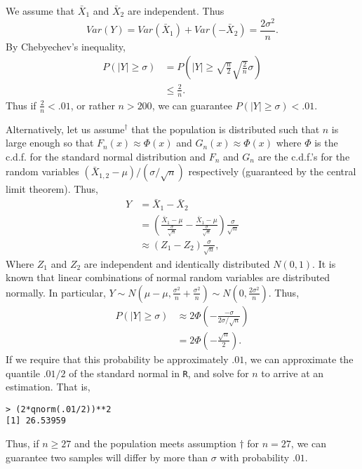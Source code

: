 \documentclass{stat_homework}
\begin{document}
\begin{solution}
  We assume that $\bar X_1$ and $\bar X_2$ are independent.  Thus 
  $$Var(Y) = Var(\bar X_1) + Var(-\bar X_2) = \frac{2\sigma^2}{n}.$$
  By Chebyechev's inequality,
  \begin{align*}
  P(|Y| \ge \sigma ) 
  &= P\left( |Y| \ge \sqrt{\frac n2} \sqrt{\frac 2n}\sigma\right) \\
  &\le \frac 2n. 
  \end{align*}
  Thus if $\frac 2n < .01 $, or rather $n > 200$, we can guarantee $P(|Y| \ge \sigma) < .01$.

  Alternatively, let us assume$^\dagger$ that the population is distributed such that $n$ is large enough so that $F_{n}(x) \approx \Phi(x)$ and $G_n(x) \approx \Phi(x)$ where $\Phi$ is the c.d.f. for the standard normal distribution and $F_{n}$ and $G_{n}$ are the c.d.f.'s for the random variables $(\bar X_{1,2} -\mu)/(\sigma/\sqrt {n})$ respectively (guaranteed by the central limit theorem). Thus,
  \begin{align*}
    Y &= \bar X_1 - \bar X_2 \\
      &= \left( \frac{\bar X_1 - \mu}{\frac{\sigma}{\sqrt n}} - \frac{\bar X_1 - \mu}{\frac{\sigma}{\sqrt n}}\right) \frac{\sigma}{\sqrt n} \\
      &\approx (Z_1 - Z_2)\frac{\sigma}{\sqrt n},
  \end{align*}
  Where $Z_1$ and $Z_2$ are independent and identically distributed $N(0,1)$.  It is known that linear combinations of normal random variables are distributed normally.  In particular, $Y \sim N\left( \mu - \mu , \frac{\sigma^2}{n} + \frac{\sigma^2}{n}\right)\sim N\left(0,\frac{2\sigma^2}{n}\right)$. Thus,
  \begin{align*}
    P(|Y| \ge \sigma) 
    &\approx 2 \Phi\left( - \frac{-\sigma}{2\sigma/\sqrt n} \right) \\
    &= 2\Phi \left( - \frac{\sqrt n}2\right).
  \end{align*}
  If we require that this probability be approximately $.01$, we can approximate the quantile $.01/2$ of the standard normal in \texttt{R}, and solve for $n$ to arrive at an estimation.  That is,
\begin{verbatim}
> (2*qnorm(.01/2))**2 
[1] 26.53959
\end{verbatim}
Thus, if $n \ge 27$ and the population meets assumption $\dagger$ for $n=27$, we can guarantee two samples will differ by more than $\sigma$ with probability $.01$.
\end{solution}
\end{document}
